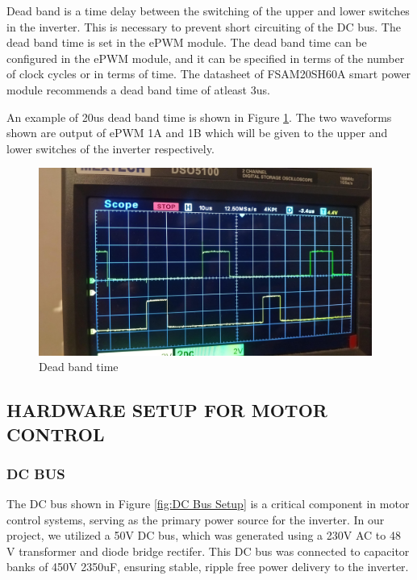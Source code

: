 Dead band is a time delay between the switching of the upper and lower switches in the inverter. This is necessary to prevent short circuiting of the DC bus. The dead band time is set in the ePWM module. The dead band time can be configured in the ePWM module, and it can be specified in terms of the number of clock cycles or in terms of time. The datasheet of FSAM20SH60A smart power module recommends a dead band time of atleast 3us.


\vspace{0.2in}

An example of 20us dead band time is shown in Figure \ref{fig:deadBand}. The two waveforms shown are output of ePWM 1A and 1B which will be given to the upper and lower switches of the inverter respectively.

\begin{figure}[H]
	\centering
	\includegraphics[width=4.3in]{sections/section6/images/SVPWM/DeadBand20Us.jpeg}
	\caption{Dead band time}
	\label{fig:deadBand}
\end{figure}


\newpage



\subsection{HARDWARE SETUP FOR MOTOR CONTROL}

\subsubsection{DC BUS}

The DC bus shown in Figure \ref{fig:DC Bus Setup} is a critical component in motor control systems, serving as the primary power source for the inverter. In our project, we utilized a 50V DC bus, which was generated using a 230V AC to 48 V transformer and diode bridge rectifer. This DC bus was connected to capacitor banks of 450V 2350uF, ensuring stable, ripple free power delivery to the inverter.

